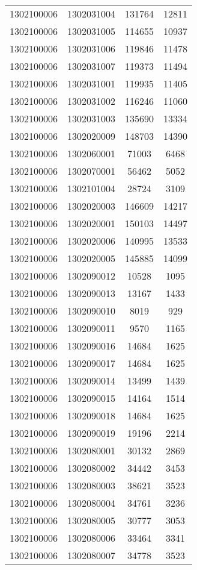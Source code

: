 \begin{longtable}{llcc}
1302100006 & 1302031004 & 131764 & 12811\\
1302100006 & 1302031005 & 114655 & 10937\\
1302100006 & 1302031006 & 119846 & 11478\\
1302100006 & 1302031007 & 119373 & 11494\\
1302100006 & 1302031001 & 119935 & 11405\\
1302100006 & 1302031002 & 116246 & 11060\\
1302100006 & 1302031003 & 135690 & 13334\\
1302100006 & 1302020009 & 148703 & 14390\\
1302100006 & 1302060001 & 71003 & 6468\\
1302100006 & 1302070001 & 56462 & 5052\\
1302100006 & 1302101004 & 28724 & 3109\\
1302100006 & 1302020003 & 146609 & 14217\\
1302100006 & 1302020001 & 150103 & 14497\\
1302100006 & 1302020006 & 140995 & 13533\\
1302100006 & 1302020005 & 145885 & 14099\\
1302100006 & 1302090012 & 10528 & 1095\\
1302100006 & 1302090013 & 13167 & 1433\\
1302100006 & 1302090010 & 8019 & 929\\
1302100006 & 1302090011 & 9570 & 1165\\
1302100006 & 1302090016 & 14684 & 1625\\
1302100006 & 1302090017 & 14684 & 1625\\
1302100006 & 1302090014 & 13499 & 1439\\
1302100006 & 1302090015 & 14164 & 1514\\
1302100006 & 1302090018 & 14684 & 1625\\
1302100006 & 1302090019 & 19196 & 2214\\
1302100006 & 1302080001 & 30132 & 2869\\
1302100006 & 1302080002 & 34442 & 3453\\
1302100006 & 1302080003 & 38621 & 3523\\
1302100006 & 1302080004 & 34761 & 3236\\
1302100006 & 1302080005 & 30777 & 3053\\
1302100006 & 1302080006 & 33464 & 3341\\
1302100006 & 1302080007 & 34778 & 3523\\

\end{longtable}
